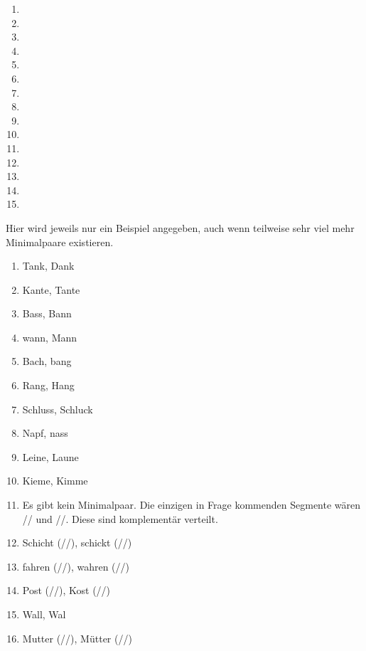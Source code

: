 
\begin{enumerate}\Lf
  \item {} 
  \item \textipa{[ni:z@n]}
  \item \textipa{[vIs@n]}
  \item {}
  \item \textipa{[defini\t{ts}Jo:n]}
  \item \textipa{[f5P\t{aE}nsh\t{aO}s]}
  \item \textipa{[kl\t{aE}nI\c{c}k\t{aE}t]}
  \item \textipa{[za:n@t\t{O@}t@]}
  \item \textipa{[hu:st@nzaft]}
  \item \textipa{[Po:n@]}
  \item \textipa{[b@StImUN]}
  \item \textipa{[tu:X]}
  \item \textipa{[SUps@n]}
  \item \textipa{[b\t{E@}\c{c}@n]}
  \item {}
\end{enumerate}



Hier wird jeweils nur ein Beispiel angegeben, auch wenn teilweise sehr viel mehr Minimalpaare existieren.

\begin{enumerate}\Lf
  \item Tank, Dank
  \item Kante, Tante
  \item Bass, Bann
  \item wann, Mann
  \item Bach, bang
  \item Rang, Hang
  \item Schluss, Schluck
  \item Napf, nass
  \item Leine, Laune
  \item Kieme, Kimme
  \item Es gibt kein Minimalpaar.
    Die einzigen in Frage kommenden Segmente wären // und //.
    Diese sind komplementär verteilt.
  \item Schicht (//), schickt (//)
  \item fahren (//), wahren (//)
  \item Post (//), Kost (//)
  \item Wall, Wal
  \item Mutter (//), Mütter (//)
\end{enumerate}

